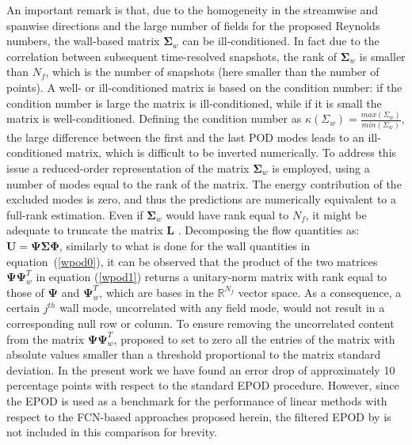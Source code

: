 An important remark is that, due to the homogeneity in the streamwise and spanwise directions and the large number of fields for the proposed Reynolds numbers, the wall-based matrix $\boldsymbol{\Sigma}_{w}$ can be ill-conditioned.
In fact due to the correlation between subsequent time-resolved snapshots, the rank of $\boldsymbol{\Sigma}_{w}$ is smaller than $N_f$, which is the number of snapshots (here smaller than the number of points).
A well- or ill-conditioned matrix is based on the condition number: if the condition number is large the matrix is ill-conditioned, while if it is small the matrix is well-conditioned.
Defining the condition number as $\kappa(\Sigma_w)=\frac{max(\Sigma_w)}{min(\Sigma_w)}$, the large difference between the first and the last POD modes leads to an ill-conditioned matrix, which is difficult to be inverted numerically.
To address this issue a reduced-order representation of the matrix $\boldsymbol{\Sigma}_w$ is employed, using a number of modes equal to the rank of the matrix. The energy contribution of the excluded modes is zero, and thus the predictions are numerically equivalent to a full-rank estimation.
Even if $\boldsymbol{\Sigma}_w$ would have rank equal to $N_f$, it might be adequate to truncate the matrix $\boldsymbol{L}$ \citep{discetti2018estimation}.
Decomposing the flow quantities as: $\mathbf{U}=\boldsymbol{\Psi}\boldsymbol{\Sigma}\boldsymbol{\Phi}$, similarly to what is done for the wall quantities in equation~(\ref{wpod0}), it can be observed that the product of the two matrices $\boldsymbol{\Psi}\boldsymbol{\Psi}_{w}^{T}$ in equation (\ref{wpod1}) returns a unitary-norm matrix with rank equal to those of $\boldsymbol{\Psi}$ and $\boldsymbol{\Psi}_{w}^{T}$, which are bases in the $\mathbb{R}^{N_f}$ vector space.
As a consequence, a certain $j^{th}$ wall mode, uncorrelated with any field mode, would not result in a corresponding null row or column. To ensure removing the uncorrelated content from the matrix $\boldsymbol{\Psi}\boldsymbol{\Psi}_{w}^{T}$, \citet{discetti2018estimation} proposed to set to zero all the entries of the matrix with absolute values smaller than a threshold proportional to the matrix standard deviation.
In the present work we have found an error drop of approximately 10 percentage points with respect to the standard EPOD procedure.
However, since the EPOD is used as a benchmark for the performance of linear methods with respect to the FCN-based approaches proposed herein, the filtered EPOD by \citet{discetti2018estimation} is not included in this comparison for brevity.

